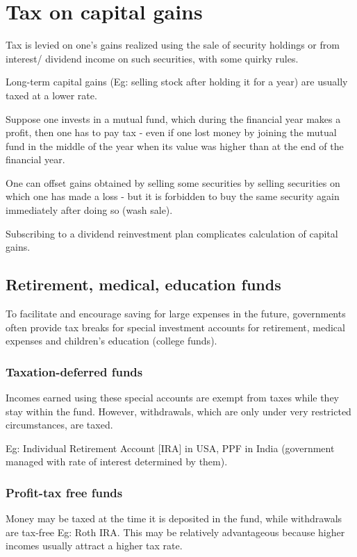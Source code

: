 \documentclass[oneside, article]{memoir}
\begin{document}
\section{Tax on capital gains}
Tax is levied on one's gains realized using the sale of security holdings or from interest/ dividend income on such securities, with some quirky rules.

Long-term capital gains (Eg: selling stock after holding it for a year) are usually taxed at a lower rate.

Suppose one invests in a mutual fund, which during the financial year makes a profit, then one has to pay tax - even if one lost money by joining the mutual fund in the middle of the year when its value was higher than at the end of the financial year.

One can offset gains obtained by selling some securities by selling securities on which one has made a loss - but it is forbidden to buy the same security again immediately after doing so (wash sale).

Subscribing to a dividend reinvestment plan complicates calculation of capital gains.

\subsection{Retirement, medical, education funds}
To facilitate and encourage saving for large expenses in the future, governments often provide tax breaks for special investment accounts for retirement, medical expenses and children's education (college funds). 

\subsubsection{Taxation-deferred funds}
Incomes earned using these special accounts are exempt from taxes while they stay within the fund. However, withdrawals, which are only under very restricted circumstances, are taxed. 

Eg: Individual Retirement Account [IRA] in USA, PPF in India (government managed with rate of interest determined by them). 

\subsubsection{Profit-tax free funds}
Money may be taxed at the time it is deposited in the fund, while withdrawals are tax-free Eg: Roth IRA. This may be relatively advantageous because higher incomes usually attract a higher tax rate.
\end{document}
